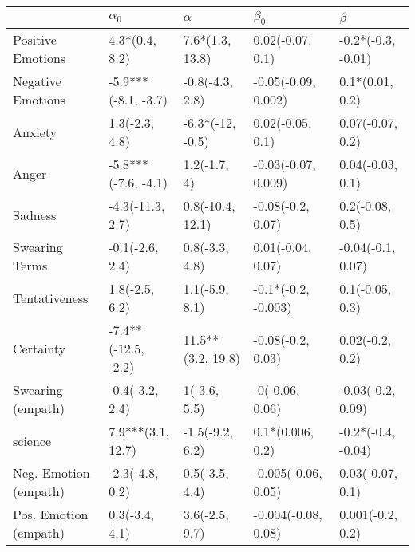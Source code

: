 \begin{tabular}{lllll}
\toprule
{} &           $\alpha_0$ &           $\alpha$ &            $\beta_0$ &             $\beta$ \\
\midrule
Positive Emotions     &       4.3*(0.4, 8.2) &    7.6*(1.3, 13.8) &     0.02(-0.07, 0.1) &  -0.2*(-0.3, -0.01) \\
Negative Emotions     &  -5.9***(-8.1, -3.7) &    -0.8(-4.3, 2.8) &  -0.05(-0.09, 0.002) &     0.1*(0.01, 0.2) \\
Anxiety               &       1.3(-2.3, 4.8) &   -6.3*(-12, -0.5) &     0.02(-0.05, 0.1) &    0.07(-0.07, 0.2) \\
Anger                 &  -5.8***(-7.6, -4.1) &       1.2(-1.7, 4) &  -0.03(-0.07, 0.009) &    0.04(-0.03, 0.1) \\
Sadness               &     -4.3(-11.3, 2.7) &   0.8(-10.4, 12.1) &    -0.08(-0.2, 0.07) &     0.2(-0.08, 0.5) \\
Swearing Terms        &      -0.1(-2.6, 2.4) &     0.8(-3.3, 4.8) &    0.01(-0.04, 0.07) &   -0.04(-0.1, 0.07) \\
Tentativeness         &       1.8(-2.5, 6.2) &     1.1(-5.9, 8.1) &  -0.1*(-0.2, -0.003) &     0.1(-0.05, 0.3) \\
Certainty             &  -7.4**(-12.5, -2.2) &  11.5**(3.2, 19.8) &    -0.08(-0.2, 0.03) &     0.02(-0.2, 0.2) \\
Swearing (empath)     &      -0.4(-3.2, 2.4) &       1(-3.6, 5.5) &      -0(-0.06, 0.06) &   -0.03(-0.2, 0.09) \\
science               &    7.9***(3.1, 12.7) &    -1.5(-9.2, 6.2) &     0.1*(0.006, 0.2) &  -0.2*(-0.4, -0.04) \\
Neg. Emotion (empath) &      -2.3(-4.8, 0.2) &     0.5(-3.5, 4.4) &  -0.005(-0.06, 0.05) &    0.03(-0.07, 0.1) \\
Pos. Emotion (empath) &       0.3(-3.4, 4.1) &     3.6(-2.5, 9.7) &  -0.004(-0.08, 0.08) &    0.001(-0.2, 0.2) \\
\bottomrule
\end{tabular}
